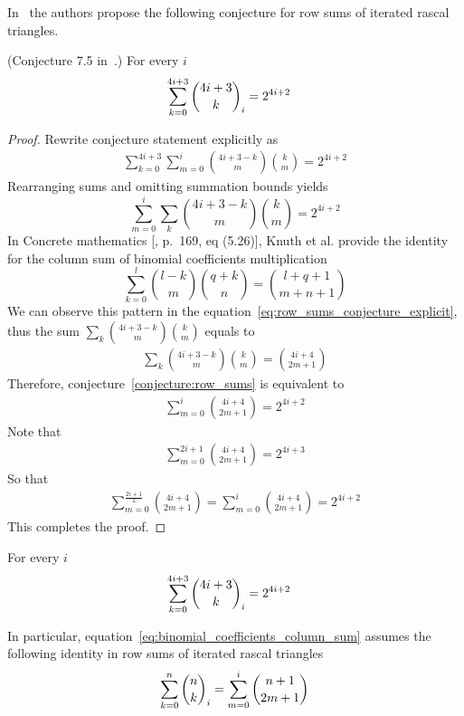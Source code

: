 ﻿In~\cite{gregory2023iterated} the authors
propose the following conjecture for row sums of iterated rascal triangles.
\begin{conj}
    \label{conjecture:row_sums}
    (Conjecture 7.5 in~\cite{gregory2023iterated}.)
    For every $i$
    \begin{align*}
        \sum_{k=0}^{4i+3} \binom{4i+3}{k}_{i} &= 2^{4i+2}
    \end{align*}
\end{conj}
\begin{proof}
    Rewrite conjecture statement explicitly as
    \begin{align*}
        \sum_{k=0}^{4i+3} \sum_{m=0}^{i} \binom{4i+3-k}{m} \binom{k}{m} = 2^{4i+2}
    \end{align*}
    Rearranging sums and omitting summation bounds yields
    \begin{equation}
        \sum_{m=0}^{i}  \sum_{k} \binom{4i+3-k}{m} \binom{k}{m} = 2^{4i+2}\label{eq:row_sums_conjecture_explicit}
    \end{equation}
    In Concrete mathematics [\cite{graham1994concrete}, p.\ 169, eq (5.26)], Knuth et al.
    provide the identity for the column sum of binomial coefficients multiplication
    \begin{equation}
        \label{eq:binomial_coefficients_column_sum}
        \sum_{k=0}^{l} \binom{l-k}{m} \binom{q+k}{n} = \binom{l+q+1}{m+n+1}
    \end{equation}
    We can observe this pattern in the equation~\eqref{eq:row_sums_conjecture_explicit},
    thus the sum $\sum_{k} \binom{4i+3-k}{m} \binom{k}{m}$ equals to
    \begin{align*}
        \sum_{k} \binom{4i+3-k}{m} \binom{k}{m} = \binom{4i+4}{2m+1}
    \end{align*}
    Therefore, conjecture~\eqref{conjecture:row_sums} is equivalent to
    \begin{align*}
        \sum_{m=0}^{i} \binom{4i+4}{2m+1} = 2^{4i+2}
    \end{align*}
    Note that
    \begin{align*}
        \sum_{m=0}^{2i+1} \binom{4i+4}{2m+1} = 2^{4i+3}
    \end{align*}
    So that
    \begin{align*}
        \sum_{m=0}^{\frac{2i+1}{2}} \binom{4i+4}{2m+1} = \sum_{m=0}^{i} \binom{4i+4}{2m+1} = 2^{4i+2}
    \end{align*}
    This completes the proof.
\end{proof}
\begin{proposition}
    For every $i$
    \begin{align*}
        \sum_{k=0}^{4i+3} \binom{4i+3}{k}_{i} &= 2^{4i+2}
    \end{align*}
\end{proposition}
In particular, equation~\eqref{eq:binomial_coefficients_column_sum} assumes the following identity in
row sums of iterated rascal triangles
\begin{align*}
    \sum\limits_{k=0}^n \binom{n}{k}_{i} = \sum_{m=0}^{i} \binom{n+1}{2m+1}
\end{align*}
